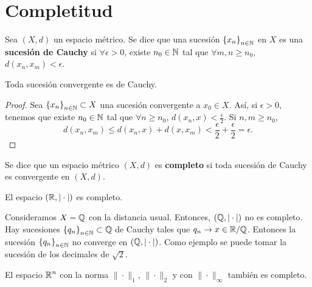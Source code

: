 \section{Completitud}
\begin{definition}
	Sea $\displaystyle \left(X,d\right) $ un espacio métrico. Se dice que una sucesión $\displaystyle \left\{ x_{n}\right\} _{n\in\mathbb{N}} $ en $\displaystyle X $ es una \textbf{sucesión de Cauchy} si $\displaystyle \forall \epsilon > 0 $, existe $\displaystyle n_{0} \in \mathbb{N} $ tal que $\displaystyle \forall m,n \geq n_{0} $, $\displaystyle d\left(x_{n}, x_{m}\right) < \epsilon  $.
\end{definition}
\begin{prop}
Toda sucesión convergente es de Cauchy.
\end{prop}
\begin{proof}
	Sea $\displaystyle \left\{ x_{n}\right\} _{n\in\mathbb{N}} \subset X $ una sucesión convergente a $\displaystyle x_{0} \in X $.  Así, si $\displaystyle \epsilon > 0 $, tenemos que existe $\displaystyle n_{0} \in \mathbb{N} $ tal que $\displaystyle \forall n \geq n_{0} $, $\displaystyle d\left(x_{n}, x\right) < \frac{\epsilon }{2} $. Si $\displaystyle n, m \geq n_{0} $,
	\[d\left(x_{n}, x_{m}\right) \leq d\left(x_{n}, x\right) + d\left(x, x_{m}\right) < \frac{\epsilon }{2} + \frac{\epsilon }{2} = \epsilon  .\]
\end{proof}
\begin{definition}
Se dice que un espacio métrico $\displaystyle \left(X,d\right) $ es \textbf{completo} si toda sucesión de Cauchy es convergente en $\displaystyle \left(X,d\right) $.
\end{definition}
\begin{theorem}
El espacio $\displaystyle \left(\mathbb{R}, |\cdot|\right) $ es completo.
\end{theorem}
\begin{eg}
	Consideramos $\displaystyle X = \mathbb{Q} $ con la distancia usual. Entonces, $\displaystyle \left(\mathbb{Q}, | \cdot |\right) $ no es completo. Hay sucesiones $\displaystyle \left\{ q_{n}\right\} _{n\in\mathbb{N}} \subset \mathbb{Q} $ de Cauchy tales que $\displaystyle q_{n} \to x \in \mathbb{R}/\mathbb{Q} $. Entonces la sucesión $\displaystyle \left\{ q_{n}\right\} _{n\in\mathbb{N}} $ no converge en $\displaystyle \left(\mathbb{Q}, | \cdot |\right) $. Como ejemplo se puede tomar la sucesión de los decimales de $\displaystyle \sqrt{2} $.
\end{eg}
\begin{colorary}
El espacio $\displaystyle \mathbb{R}^{n} $ con la norma $\displaystyle \| \cdot \|_{1} $, $\displaystyle \| \cdot \|_{2} $ y con $\displaystyle \| \cdot \|_{\infty} $ también es completo.
\end{colorary}
